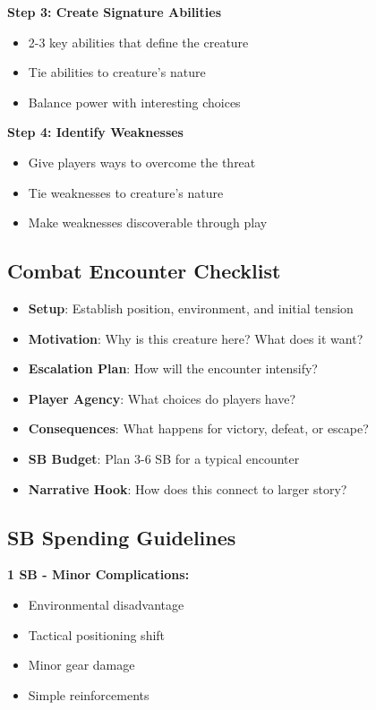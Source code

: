 \documentclass[12pt]{article}
\begin{document}
\begin{itemize}
\textbf{Step 3: Create Signature Abilities}
\begin{itemize}
\item 2-3 key abilities that define the creature
\item Tie abilities to creature's nature
\item Balance power with interesting choices
\end{itemize}

\textbf{Step 4: Identify Weaknesses}
\begin{itemize}
\item Give players ways to overcome the threat
\item Tie weaknesses to creature's nature
\item Make weaknesses discoverable through play
\end{itemize}

\subsection*{Combat Encounter Checklist}

\begin{itemize}
\item \textbf{Setup}: Establish position, environment, and initial tension
\item \textbf{Motivation}: Why is this creature here? What does it want?
\item \textbf{Escalation Plan}: How will the encounter intensify?
\item \textbf{Player Agency}: What choices do players have?
\item \textbf{Consequences}: What happens for victory, defeat, or escape?
\item \textbf{SB Budget}: Plan 3-6 SB for a typical encounter
\item \textbf{Narrative Hook}: How does this connect to larger story?
\end{itemize}

\subsection*{SB Spending Guidelines}

\textbf{1 SB - Minor Complications:}
\begin{itemize}
\item Environmental disadvantage
\item Tactical positioning shift
\item Minor gear damage
\item Simple reinforcements
\end{itemize}


\end{itemize}
\end{document}
